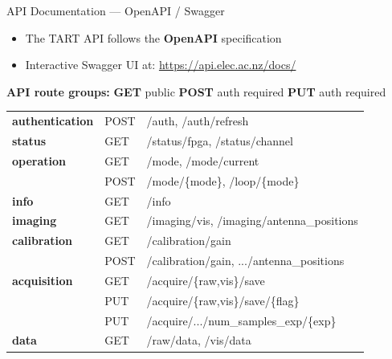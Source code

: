 \documentclass[ignorenonframetext]{beamer}
\begin{document}
\begin{frame}[fragile]{API Documentation --- OpenAPI / Swagger}
	\begin{itemize}
		\item The TART API follows the \textbf{OpenAPI} specification
		\item Interactive Swagger UI at: {\small \url{https://api.elec.ac.nz/docs/}}
	\end{itemize}

	\vspace{0.2cm}
	\textbf{API route groups:}
	{\scriptsize
		\colorbox{swagger-get!15}{\textbf{\textcolor{swagger-get}{GET}}} public \quad
		\colorbox{swagger-post!15}{\textbf{\textcolor{swagger-post}{POST}}} auth required \quad
		\colorbox{swagger-put!15}{\textbf{\textcolor{swagger-put}{PUT}}} auth required
	}

	\vspace{0.1cm}
	{\small\ttfamily
		\begin{tabular}{@{}l l l@{}}
			\textbf{authentication} & \colorbox{swagger-post!15}{\textcolor{swagger-post}{POST}} & /auth, /auth/refresh                      \\
			\textbf{status}         & \colorbox{swagger-get!15}{\textcolor{swagger-get}{GET}}    & /status/fpga, /status/channel             \\
			\textbf{operation}      & \colorbox{swagger-get!15}{\textcolor{swagger-get}{GET}}    & /mode, /mode/current                      \\
			                        & \colorbox{swagger-post!15}{\textcolor{swagger-post}{POST}} & /mode/\{mode\}, /loop/\{mode\}            \\
			\textbf{info}           & \colorbox{swagger-get!15}{\textcolor{swagger-get}{GET}}    & /info                                     \\
			\textbf{imaging}        & \colorbox{swagger-get!15}{\textcolor{swagger-get}{GET}}    & /imaging/vis, /imaging/antenna\_positions \\
			\textbf{calibration}    & \colorbox{swagger-get!15}{\textcolor{swagger-get}{GET}}    & /calibration/gain                         \\
			                        & \colorbox{swagger-post!15}{\textcolor{swagger-post}{POST}} & /calibration/gain, .../antenna\_positions \\
			\textbf{acquisition}    & \colorbox{swagger-get!15}{\textcolor{swagger-get}{GET}}    & /acquire/\{raw,vis\}/save                 \\
			                        & \colorbox{swagger-put!15}{\textcolor{swagger-put}{PUT}}    & /acquire/\{raw,vis\}/save/\{flag\}        \\
			                        & \colorbox{swagger-put!15}{\textcolor{swagger-put}{PUT}}    & /acquire/.../num\_samples\_exp/\{exp\}    \\
			\textbf{data}           & \colorbox{swagger-get!15}{\textcolor{swagger-get}{GET}}    & /raw/data, /vis/data                      \\
		\end{tabular}
	}
\end{frame}
\end{document}
